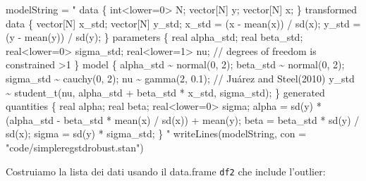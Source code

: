 \documentclass[
  10pt,
  italian,
  a4paper,
  extrafontsizes,onecolumn,openright
  ]{memoir}
\newenvironment{Shaded}{\begin{snugshade}}{\end{snugshade}}
\newcommand{\AttributeTok}[1]{\textcolor[rgb]{0.77,0.63,0.00}{#1}}
\newcommand{\FunctionTok}[1]{\textcolor[rgb]{0.00,0.00,0.00}{#1}}
\newcommand{\NormalTok}[1]{#1}
\newcommand{\OtherTok}[1]{\textcolor[rgb]{0.56,0.35,0.01}{#1}}
\newcommand{\SpecialCharTok}[1]{\textcolor[rgb]{0.00,0.00,0.00}{#1}}
\newcommand{\StringTok}[1]{\textcolor[rgb]{0.31,0.60,0.02}{#1}}
\begin{document}
\begin{Shaded}
\begin{Highlighting}[]
\NormalTok{modelString }\OtherTok{=} \StringTok{"}
\StringTok{data \{}
\StringTok{  int\textless{}lower=0\textgreater{} N;}
\StringTok{  vector[N] y;}
\StringTok{  vector[N] x;}
\StringTok{\}}
\StringTok{transformed data \{}
\StringTok{  vector[N] x\_std;}
\StringTok{  vector[N] y\_std;}
\StringTok{  x\_std = (x {-} mean(x)) / sd(x);}
\StringTok{  y\_std = (y {-} mean(y)) / sd(y);}
\StringTok{\}}
\StringTok{parameters \{}
\StringTok{  real alpha\_std;}
\StringTok{  real beta\_std;}
\StringTok{  real\textless{}lower=0\textgreater{} sigma\_std;}
\StringTok{  real\textless{}lower=1\textgreater{} nu;    // degrees of freedom is constrained \textgreater{}1}
\StringTok{\}}
\StringTok{model \{}
\StringTok{  alpha\_std \textasciitilde{} normal(0, 2);}
\StringTok{  beta\_std \textasciitilde{} normal(0, 2);}
\StringTok{  sigma\_std \textasciitilde{} cauchy(0, 2);}
\StringTok{  nu \textasciitilde{} gamma(2, 0.1);   // Juárez and Steel(2010)}
\StringTok{  y\_std \textasciitilde{} student\_t(nu, alpha\_std + beta\_std * x\_std, sigma\_std);}
\StringTok{\}}
\StringTok{generated quantities \{}
\StringTok{  real alpha;}
\StringTok{  real beta;}
\StringTok{  real\textless{}lower=0\textgreater{} sigma;}
\StringTok{  alpha = sd(y) * (alpha\_std {-} beta\_std * mean(x) / sd(x))}
\StringTok{           + mean(y);}
\StringTok{  beta = beta\_std * sd(y) / sd(x);}
\StringTok{  sigma = sd(y) * sigma\_std;}
\StringTok{\}}
\StringTok{"}
\FunctionTok{writeLines}\NormalTok{(modelString, }\AttributeTok{con =} \StringTok{"code/simpleregstdrobust.stan"}\NormalTok{)}
\end{Highlighting}
\end{Shaded}

\noindent
Costruiamo la lista dei dati usando il data.frame \texttt{df2} che include l'outlier:

\begin{Shaded}
\end{Shaded}
\end{document}
